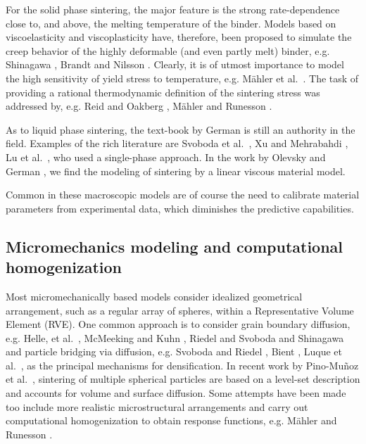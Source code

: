 \documentclass[MikaelDissertation.tex]{subfiles}
\begin{document}
For the solid phase sintering, the major feature is the strong rate-dependence close to, and above, the melting temperature of the binder.
Models based on viscoelasticity and viscoplasticity have, therefore, been proposed to simulate the creep behavior of the highly deformable (and even partly melt) binder, e.g. Shinagawa \cite{shinagawa_finite_1996}, Brandt and Nilsson \cite{brandt_fe-simulation_1998}.
Clearly, it is of utmost importance to model the high sensitivity of yield stress to temperature, e.g. Mähler et al.\ \cite{mahler_modelling_2000}.
The task of providing a rational thermodynamic definition of the sintering stress was addressed by, e.g. Reid and Oakberg \cite{reid_continuum_1990}, Mähler and Runesson \cite{mahler_constitutive_2003}.

As to liquid phase sintering, the text-book by German \cite{german_sintering_1996} is still an authority in the field.
Examples of the rich literature are Svoboda et al.\ \cite{svoboda_model_1996}, Xu and Mehrabahdi \cite{xu_micromechanical_1997}, Lu et al.\ \cite{lu_porosity_2001}, who used a single-phase approach.
In the work by Olevsky and German \cite{olevsky_theory_1998}, \cite{olevsky_effect_2000} we find the modeling of sintering by a linear viscous material model.

Common in these macroscopic models are of course the need to calibrate material parameters from experimental data, which diminishes the predictive capabilities.


\subsection{Micromechanics modeling and computational homogenization}

Most micromechanically based models consider idealized geometrical arrangement, such as a regular array of spheres, within a Representative Volume Element (RVE).
One common approach is to consider grain boundary diffusion, e.g. Helle, et al.\ \cite{helle_hot-isostatic_1985}, McMeeking and Kuhn \cite{mcmeeking_diffusional_1992}, Riedel and Svoboda \cite{riedel_theoretical_1993} and Shinagawa \cite{shinagawa_finite_1996} and particle bridging via diffusion, e.g. Svoboda and Riedel \cite{svoboda_new_1995}, Bient \cite{bient_modeling_2004}, Luque et al.\ \cite{luque_simulation_2005}, as the principal mechanisms for densification.
In recent work by Pino-Muñoz et al.\ \cite{pino_munoz_direct_2013}, sintering of multiple spherical particles are based on a level-set description and accounts for volume and surface diffusion.
Some attempts have been made too include more realistic microstructural arrangements and carry out computational homogenization to obtain response functions, e.g. Mähler and Runesson \cite{mahler_modelling_2000}.
\end{document}
